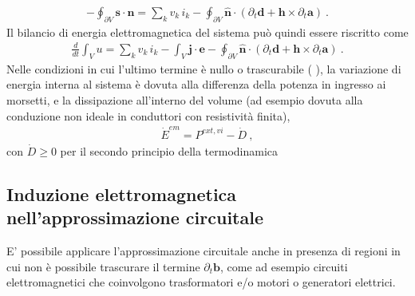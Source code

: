 \documentclass[letterpaper,10pt,english]{jupyterBook}
\begin{document}
\begin{equation*}
\begin{split}- \oint_{\partial V} \mathbf{s} \cdot \hat{\mathbf{n}} = \sum_k v_k \, i_k - \oint_{\partial V} \hat{\mathbf{n}} \cdot \left( \partial_t \mathbf{d} + \mathbf{h} \times \partial_t \mathbf{a} \right) \ .\end{split}
\end{equation*}
\sphinxAtStartPar
Il bilancio di energia elettromagnetica del sistema può quindi essere riscritto come
\begin{equation*}
\begin{split}\frac{d}{dt} \int_V u = \sum_k v_k \, i_k - \int_{V} \mathbf{j} \cdot \mathbf{e} - \oint_{\partial V} \hat{\mathbf{n}} \cdot \left( \partial_t \mathbf{d} + \mathbf{h} \times \partial_t \mathbf{a} \right) \ .\end{split}
\end{equation*}
\sphinxAtStartPar
Nelle condizioni in cui l’ultimo termine è nullo o trascurabile ( ), la variazione di energia interna al sistema è dovuta alla differenza della potenza in ingresso ai morsetti, e la dissipazione all’interno del volume (ad esempio dovuta alla conduzione non ideale in conduttori con resistività finita),
\begin{equation*}
\begin{split}\dot{E}^{em} = P^{ext, vi} - \dot{D} \ ,\end{split}
\end{equation*}
\sphinxAtStartPar
con \(\dot{D} \ge 0\) per il secondo principio della termodinamica  

\sphinxstepscope




\subsection{Induzione elettromagnetica nell’approssimazione circuitale}
\label{\detokenize{ch/circuits-electric-induction:induzione-elettromagnetica-nell-approssimazione-circuitale}}\label{\detokenize{ch/circuits-electric-induction:classical-electromagnetism-circuits-electric-induction}}\label{\detokenize{ch/circuits-electric-induction::doc}}
\sphinxAtStartPar
E’ possibile applicare l’approssimazione circuitale anche in presenza di regioni in cui non è possibile trascurare il termine \(\partial_t \mathbf{b}\), come ad esempio circuiti elettromagnetici che coinvolgono trasformatori e/o motori o generatori elettrici.
\end{document}

